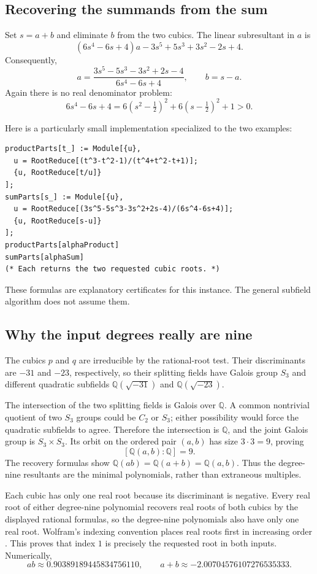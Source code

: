 \documentclass[11pt,a4paper]{article}
\newcommand{\Q}{\mathbb Q}
\theoremstyle{remark}\newtheorem{remark}[theorem]{Remark}
\begin{document}
\subsection{Recovering the summands from the sum}
Set $s=a+b$ and eliminate $b$ from the two cubics. The linear subresultant in $a$ is
\[
 (6s^4-6s+4)a-3s^5+5s^3+3s^2-2s+4.
\]
Consequently,
\begin{equation}
 \boxed{a=\frac{3s^5-5s^3-3s^2+2s-4}{6s^4-6s+4},\qquad b=s-a.}
 \label{eq:recovers}
\end{equation}
Again there is no real denominator problem:
\[
 6s^4-6s+4
 =6(s^2-\tfrac12)^2+6(s-\tfrac12)^2+1>0.
\]

Here is a particularly small implementation specialized to the two examples:
\begin{lstlisting}
productParts[t_] := Module[{u},
  u = RootReduce[(t^3-t^2-1)/(t^4+t^2-t+1)];
  {u, RootReduce[t/u]}
];
sumParts[s_] := Module[{u},
  u = RootReduce[(3s^5-5s^3-3s^2+2s-4)/(6s^4-6s+4)];
  {u, RootReduce[s-u]}
];
productParts[alphaProduct]
sumParts[alphaSum]
(* Each returns the two requested cubic roots. *)
\end{lstlisting}
These formulas are explanatory certificates for this instance. The general subfield algorithm does not assume them.

\subsection{Why the input degrees really are nine}
The cubics $p$ and $q$ are irreducible by the rational-root test. Their discriminants are $-31$ and $-23$, respectively, so their splitting fields have Galois group $S_3$ and different quadratic subfields $\Q(\sqrt{-31})$ and $\Q(\sqrt{-23})$.

The intersection of the two splitting fields is Galois over $\Q$. A common nontrivial quotient of two $S_3$ groups could be $C_2$ or $S_3$; either possibility would force the quadratic subfields to agree. Therefore the intersection is $\Q$, and the joint Galois group is $S_3\times S_3$. Its orbit on the ordered pair $(a,b)$ has size $3\cdot3=9$, proving
\[
 [\Q(a,b):\Q]=9.
\]
The recovery formulas show $\Q(ab)=\Q(a+b)=\Q(a,b)$. Thus the degree-nine resultants are the minimal polynomials, rather than extraneous multiples.

Each cubic has only one real root because its discriminant is negative. Every real root of either degree-nine polynomial recovers real roots of both cubics by the displayed rational formulas, so the degree-nine polynomials also have only one real root. Wolfram's indexing convention places real roots first in increasing order \cite{root}. This proves that index $1$ is precisely the requested root in both inputs. Numerically,
\[
 ab\approx0.90389189445834756110,\qquad
 a+b\approx-2.00704576107276535333.
\]
\end{document}
